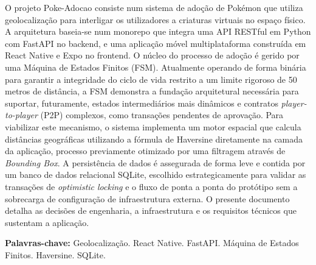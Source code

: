 \documentclass[
    12pt,
    openright,
    oneside,
    a4paper,
    english,
    brazil
    ]{abntex2}
\begin{document}
\imprimircapa
\imprimirfolhaderosto

\setlength{\absparsep}{18pt}

\begin{resumo}
O projeto Poke-Adocao consiste num sistema de adoção de Pokémon que utiliza geolocalização para interligar os utilizadores a criaturas virtuais no espaço físico. A arquitetura baseia-se num monorepo que integra uma API RESTful em Python com FastAPI no backend, e uma aplicação móvel multiplataforma construída em React Native e Expo no frontend. O núcleo do processo de adoção é gerido por uma Máquina de Estados Finitos (FSM). Atualmente operando de forma binária para garantir a integridade do ciclo de vida restrito a um limite rigoroso de 50 metros de distância, a FSM demonstra a fundação arquitetural necessária para suportar, futuramente, estados intermediários mais dinâmicos e contratos \textit{player-to-player} (P2P) complexos, como transações pendentes de aprovação. Para viabilizar este mecanismo, o sistema implementa um motor espacial que calcula distâncias geográficas utilizando a fórmula de Haversine diretamente na camada da aplicação, processo previamente otimizado por uma filtragem através de \textit{Bounding Box}. A persistência de dados é assegurada de forma leve e contida por um banco de dados relacional SQLite, escolhido estrategicamente para validar as transações de \textit{optimistic locking} e o fluxo de ponta a ponta do protótipo sem a sobrecarga de configuração de infraestrutura externa. O presente documento detalha as decisões de engenharia, a infraestrutura e os requisitos técnicos que sustentam a aplicação.

\vspace{\onelineskip}
\noindent
\textbf{Palavras-chave:} Geolocalização. React Native. FastAPI. Máquina de Estados Finitos. Haversine. SQLite.
\end{resumo}
\end{document}
